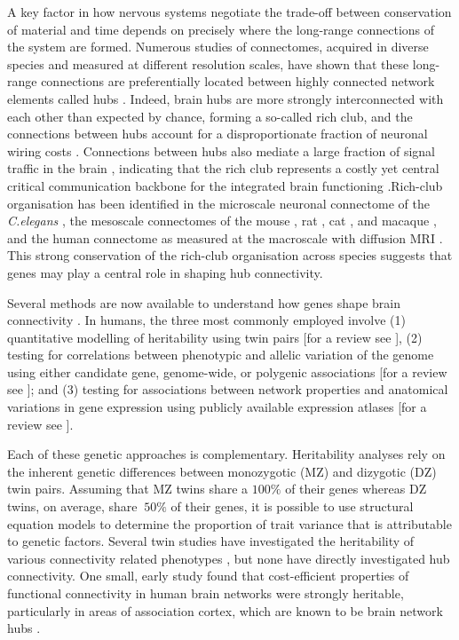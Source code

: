 A key factor in how nervous systems negotiate the trade-off between conservation of material and time depends on precisely where the long-range connections of the system are formed. Numerous studies of connectomes, acquired in diverse species and measured at different resolution scales, have shown that these long-range connections are preferentially located between highly connected network elements called hubs \citep{Harriger2012,Towlson2013,VandenHeuvel2011,VandenHeuvel2013b}. Indeed, brain hubs are more strongly interconnected with each other than expected by chance, forming a so-called rich club, and the connections between hubs account for a disproportionate fraction of neuronal wiring costs \citep{Arnatkeviciute2018,Fulcher2016,Harriger2012,Towlson2013,VandenHeuvel2011}. Connections between hubs also mediate a large fraction of signal traffic in the brain \citep{Misic2016,VandenHeuvel2011}, indicating that the rich club represents a costly yet central critical communication backbone for the integrated brain functioning \citep{Gratton2012,Markov2013a,VandenHeuvel2018,VandenHeuvel2013a}.Rich-club organisation has been identified in the microscale neuronal connectome of the \textit{C.elegans} \citep{Towlson2013}, the mesoscale connectomes of the mouse \citep{Fulcher2016}, rat \citep{Liang2017}, cat \citep{DeReus2013b}, and macaque \citep{Harriger2012}, and the human connectome as measured at the macroscale with diffusion MRI \citep{VandenHeuvel2011}. This strong conservation of the rich-club organisation across species suggests that genes may play a central role in shaping hub connectivity.

Several methods are now available to understand how genes shape brain connectivity \citep{Lein2017,Luo2018}. In humans, the three most commonly employed involve (1) quantitative modelling of heritability using twin pairs [for a review see \citep{Jansen2015}], (2) testing for correlations between phenotypic and allelic variation of the genome using either candidate gene, genome-wide, or polygenic associations [for a review see \citep{Thompson2013}]; and (3) testing for associations between network properties and anatomical variations in gene expression using publicly available expression atlases [for a review see \citep{Fornito2019}].

Each of these genetic approaches is complementary. Heritability analyses rely on the inherent genetic differences between monozygotic (MZ) and dizygotic (DZ) twin pairs. Assuming that MZ twins share a $100\%$ of their genes whereas DZ twins, on average, share $~50\%$ of their genes, it is possible to use structural equation models to determine the proportion of trait variance that is attributable to genetic factors. Several twin studies have investigated the heritability of various connectivity related phenotypes \citep{Bohlken2014,Colclough2017,Fu2015,Shen2014,Sudre2017}, but none have directly investigated hub connectivity. One small, early study found that cost-efficient properties of functional connectivity in human brain networks were strongly heritable, particularly in areas of association cortex, which are known to be brain network hubs \citep{Fornito2011}.

